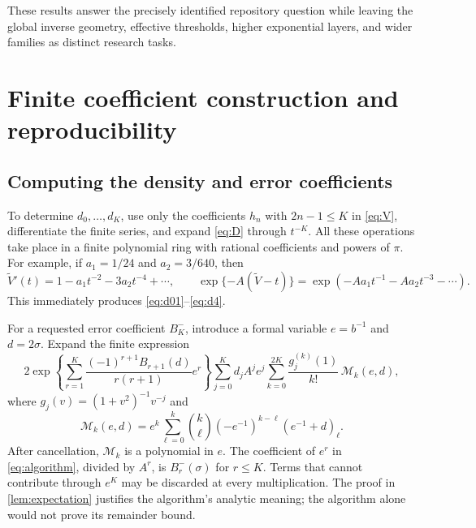 \documentclass[11pt,a4paper]{article}
\theoremstyle{definition}
\numberwithin{equation}{section}
\newcommand{\Vformal}{\widetilde V}
\newcommand{\rising}[2]{(#1)_{#2}}
\begin{document}
These results answer the precisely identified repository question while
leaving the global inverse geometry, effective thresholds, higher
exponential layers, and wider families as distinct research tasks.

\appendix
\section{Finite coefficient construction and reproducibility}
\label{app:repro}

\subsection{Computing the density and error coefficients}
To determine $d_0,\ldots,d_K$, use only the coefficients $h_n$ with
$2n-1\le K$ in \eqref{eq:V}, differentiate the finite series, and expand
\eqref{eq:D} through $t^{-K}$. All these operations take place in a
finite polynomial ring with rational coefficients and powers of $\pi$.
For example, if $a_1=1/24$ and $a_2=3/640$, then
\[
 \Vformal'(t)=1-a_1t^{-2}-3a_2t^{-4}+\cdots,
 \qquad
 \exp\{-A(\Vformal-t)\}
 =\exp(-Aa_1t^{-1}-Aa_2t^{-3}-\cdots).
\]
This immediately produces \eqref{eq:d01}--\eqref{eq:d4}.

For a requested error coefficient $B_K^-$, introduce a formal variable
$e=b^{-1}$ and $d=2\sigma$. Expand the finite expression
\begin{equation}
 2\exp\left\{\sum_{r=1}^K
   \frac{(-1)^{r+1}B_{r+1}(d)}{r(r+1)}e^r\right\}
 \sum_{j=0}^K d_j A^j e^j
 \sum_{k=0}^{2K}\frac{g_j^{(k)}(1)}{k!}\,\mathcal M_k(e,d),
 \label{eq:algorithm}
\end{equation}
where $g_j(v)=(1+v^2)^{-1}v^{-j}$ and
\begin{equation}
 \mathcal M_k(e,d)=e^k\sum_{\ell=0}^k
  \binom{k}{\ell}(-e^{-1})^{k-\ell}\rising{e^{-1}+d}{\ell}.
 \label{eq:momentpoly}
\end{equation}
After cancellation, $\mathcal M_k$ is a polynomial in $e$.
The coefficient of $e^r$ in \eqref{eq:algorithm}, divided by $A^r$,
is $B_r^-(\sigma)$ for $r\le K$. Terms that cannot contribute through
$e^K$ may be discarded at every multiplication.
The proof in \cref{lem:expectation} justifies the algorithm's analytic
meaning; the algorithm alone would not prove its remainder bound.
\end{document}
